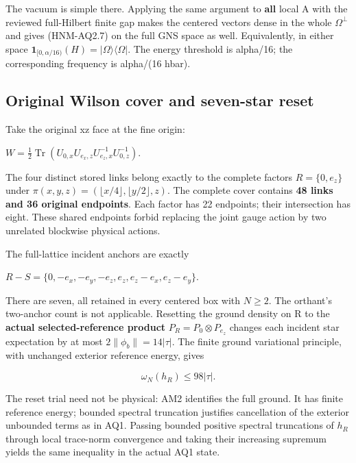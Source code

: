 The vacuum is simple there. Applying the same argument to \textbf{all} local A with the reviewed full-Hilbert finite gap makes the centered vectors dense in the whole \(\Omega^\perp\) and gives (HNM-AQ2.7) on the full GNS space as well. Equivalently, in either space \(\mathbf1_{[0,\alpha/16)}(H)=|\Omega\rangle\langle\Omega|\). The energy threshold is alpha/16; the corresponding frequency is alpha/(16 hbar).

\hypertarget{r29-aq2-original-wilson-cover-and-seven-star-reset}{%
\subsection{Original Wilson cover and seven-star reset}\label{r29:aq2:r29-aq2-original-wilson-cover-and-seven-star-reset}}

Take the original xz face at the fine origin:

\(W=\tfrac12\operatorname{Tr}(U_{0,x}U_{e_x,z}U_{e_z,x}^{-1}U_{0,z}^{-1})\).

The four distinct stored links belong exactly to the complete factors \(R=\{0,e_z\}\) under \(\pi(x,y,z)=(\lfloor x/4\rfloor,\lfloor y/2\rfloor,z)\). The complete cover contains \textbf{48 links and 36 original endpoints}. Each factor has 22 endpoints; their intersection has eight. These shared endpoints forbid replacing the joint gauge action by two unrelated blockwise physical actions.

The full-lattice incident anchors are exactly

\(R-S=\{0,-e_x,-e_y,-e_z,e_z,e_z-e_x,e_z-e_y\}\).

There are seven, all retained in every centered box with \(N\ge 2\). The orthant's two-anchor count is not applicable. Resetting the ground density on R to the \textbf{actual selected-reference product} \(P_R=P_0\otimes P_{e_z}\) changes each incident star expectation by at most \(2\|\phi_b\|=14|\tau|\). The finite ground variational principle, with unchanged exterior reference energy, gives

\begin{equation}
\omega_N(h_R)\le98|\tau|.\tag{HNM-AQ2.8}
\label{r29:aq2:eq8}
\end{equation}

The reset trial need not be physical: AM2 identifies the full ground. It has finite reference energy; bounded spectral truncation justifies cancellation of the exterior unbounded terms as in AQ1. Passing bounded positive spectral truncations of \(h_R\) through local trace-norm convergence and taking their increasing supremum yields the same inequality in the actual AQ1 state.

